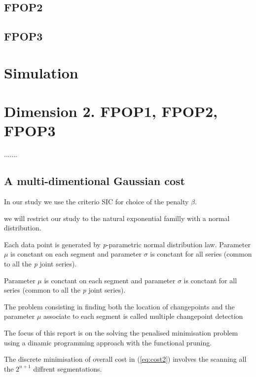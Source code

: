 \documentclass[a4paper,12pt]{article}
\begin{document}
		\subsection{FPOP2}
		\label{FPOP2}
		\subsection{FPOP3}
		\label{FPOP3}	
		\section{Simulation}
		\section{Dimension 2. FPOP1, FPOP2, FPOP3}
		.......
		\subsection{A multi-dimentional Gaussian cost}
		\label{gaussian cost}
		
		In our study we use the criterio SIC for choice of the penalty $\beta$.
		
		we will restrict our study to the natural exponential familly with a normal distribution.
		
		
		Each data point is generated by \textit{p}-parametric normal distribution law. Parameter $\mu$ is conctant on each segment and parameter  $\sigma$ is conctant for all series (common to all the \textit{p} joint series).
		
		
		Parameter $\mu$ is conctant on each segment and parameter  $\sigma$ is conctant for all series (common to all the \textit{p} joint series).
		
		
		The problem consisting in finding both the location of changepoints and the parameter $\mu$ associate to each segment  is called multiple changepoint detection 
		
		The focus of this report is on the solving the penalised minimisation problem using a dinamic programming approach with the functional pruning.
		
		
			The discrete minimisation of overall cost in (\ref{eq:cost2}) involves the scanning all the $2^{n+1}$ diffrent segmentations.  
\end{document}
